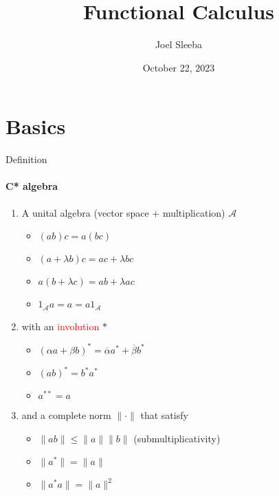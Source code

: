\documentclass[dvipsnames]{beamer}
\newcommand{\1}{\mathds{1}}	%
\begin{document}

\title{\color{titleText}Functional Calculus}
\author{Joel Sleeba\vspace{-.3cm}}
\date{\small October 22, 2023}

\begin{frame}
\titlepage
\vspace{-1.2cm}
\begin{center}
\end{center}
\end{frame}

\section{Basics}

\begin{frame}{Definition}
\framesubtitle{C* algebra}
\begin{enumerate}
  \item A unital algebra (vector space + multiplication) $\mathcal{A}$
    \begin{itemize}
      \item $(ab)c = a(bc)$
      \item $(a+ \lambda b)c = ac + \lambda bc$
      \item $a(b+ \lambda c) = ab + \lambda ac$
      \item $1_\mathcal{A} a = a = a1_\mathcal{A}$
    \end{itemize}
    \pause
  \item with an \textcolor{red}{involution} $*$
    \begin{itemize}
      \item $(\alpha a+\beta b)^* = \overline{\alpha}a^* + \overline{\beta}b^*$
      \item $(ab)^* = b^*a^*$
      \item $a^{**} = a$
    \end{itemize}
    \pause
  \item and a complete norm $\|\cdot \|$ that satisfy
    \begin{itemize}
      \item $\|ab\| \le \|a\| \|b\|$ (submultiplicativity)
      \item $\|a^*\| = \|a\|$
      \item $\|a^*a\| = \|a\|^2$
    \end{itemize}
\end{enumerate}
\end{frame}
\end{document}
